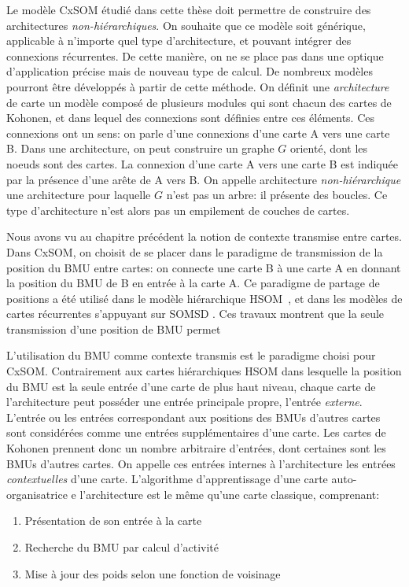 Le modèle CxSOM étudié dans cette thèse doit permettre de construire des architectures \emph{non-hiérarchiques}. On souhaite que ce modèle soit générique, applicable à n'importe quel type d'architecture, et pouvant intégrer des connexions récurrentes. De cette manière, on ne se place pas dans une optique d'application précise mais de nouveau type de calcul. De nombreux modèles pourront être développés à partir de cette méthode. 
On définit une \emph{architecture} de carte un modèle composé de plusieurs modules qui sont chacun des cartes de Kohonen, et dans lequel des connexions sont définies entre ces éléments. Ces connexions ont un sens: on parle d'une connexions d'une carte A vers une carte B.
Dans une architecture, on peut construire un graphe $G$ orienté, dont les noeuds sont des cartes. La connexion d'une carte A vers une carte B est indiquée par la présence d'une arête de A vers B. On appelle architecture \emph{non-hiérarchique} une architecture pour laquelle $G$ n'est pas un arbre: il présente des boucles. Ce type d'architecture n'est alors pas un empilement de couches de cartes.

Nous avons vu au chapitre précédent la notion de contexte transmise entre cartes. Dans CxSOM, on choisit de se placer dans le paradigme de transmission de la position du BMU entre cartes: on connecte une carte B à une carte A en donnant la position du BMU de B en entrée à la carte A. 
Ce paradigme de partage de positions a été utilisé dans le modèle hiérarchique HSOM~\cite{lampinen_clustering_1992}, et dans les modèles de cartes récurrentes s'appuyant sur SOMSD \cite{hammer_recursive_2004,hagenbuchner_self-organizing_2003,fix20}. Ces travaux montrent que la seule transmission d'une position de BMU permet 


L'utilisation du BMU comme contexte transmis est le paradigme choisi pour CxSOM. Contrairement aux cartes hiérarchiques HSOM dans lesquelle la position du BMU est la seule entrée d'une carte de plus haut niveau, chaque carte de l'architecture peut posséder une entrée principale propre, l'entrée \emph{externe}. L'entrée ou les entrées correspondant aux positions des BMUs d'autres cartes sont considérées comme une entrées supplémentaires d'une carte. Les cartes de Kohonen prennent donc un nombre arbitraire d'entrées, dont certaines sont les BMUs d'autres cartes. On appelle ces entrées internes à l'architecture les entrées \emph{contextuelles} d'une carte.
L'algorithme d'apprentissage d'une carte auto-organisatrice e l'architecture est le même qu'une carte classique, comprenant:
\begin{enumerate}
\item\label{etape:entree} Présentation de son entrée à la carte 
\item\label{etape:bmu} Recherche du BMU par calcul d'activité
\item\label{etape:maj} Mise à jour des poids selon une fonction de voisinage
\end{enumerate}

